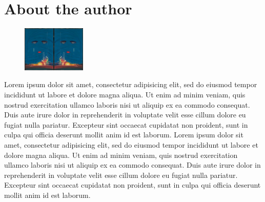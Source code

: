 \chapter{About the author}

\begin{figure}
\centering
\includegraphics[width=0.27\textwidth]{cover/dustjacket.jpg}
\end{figure}

Lorem ipsum dolor sit amet, consectetur adipisicing elit, sed do eiusmod
tempor incididunt ut labore et dolore magna aliqua. Ut enim ad minim veniam,
quis nostrud exercitation ullamco laboris nisi ut aliquip ex ea commodo
consequat. Duis aute irure dolor in reprehenderit in voluptate velit esse
cillum dolore eu fugiat nulla pariatur. Excepteur sint occaecat cupidatat non
proident, sunt in culpa qui officia deserunt mollit anim id est laborum. Lorem ipsum dolor sit amet, consectetur adipisicing elit, sed do eiusmod
tempor incididunt ut labore et dolore magna aliqua. Ut enim ad minim veniam,
quis nostrud exercitation ullamco laboris nisi ut aliquip ex ea commodo
consequat. Duis aute irure dolor in reprehenderit in voluptate velit esse
cillum dolore eu fugiat nulla pariatur. Excepteur sint occaecat cupidatat non
proident, sunt in culpa qui officia deserunt mollit anim id est laborum.

\begin{refcontext}[sorting=none]
\nocite{*}
\printbibliography[heading=subbibliography, title={Peer-reviewed Journal Publications}, type=article]
\printbibliography[heading=subbibliography, title={Other Scientific Publications}, nottype=article]
\end{refcontext}	

